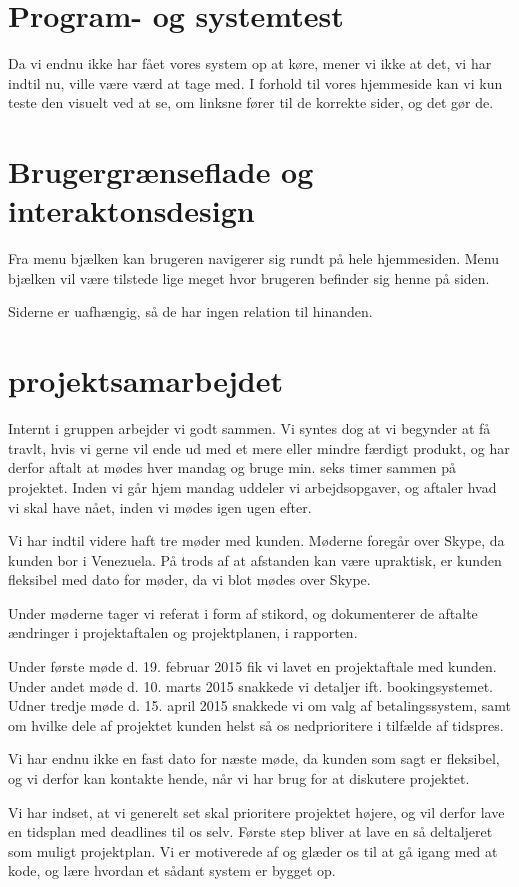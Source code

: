 \documentclass[12pt,a4paper]{article}
\begin{document}
\section{Program- og systemtest}
Da vi endnu ikke har fået vores system op at køre, mener vi ikke at det, vi har indtil nu, ville være værd at tage med. I forhold til vores hjemmeside kan vi kun teste den visuelt ved at se, om linksne fører til de korrekte sider, og det gør de.
\newpage
\section{Brugergrænseflade og interaktonsdesign}
Fra menu bjælken kan brugeren navigerer sig rundt på hele hjemmesiden. Menu bjælken vil være tilstede lige meget hvor brugeren befinder sig henne på siden.

Siderne er uafhængig, så de har ingen relation til hinanden.
\newpage
\section{projektsamarbejdet}
Internt i gruppen arbejder vi godt sammen. Vi syntes dog at vi begynder at få travlt, hvis vi gerne vil ende ud med et mere eller mindre færdigt produkt, og har derfor aftalt at mødes hver mandag og bruge min. seks timer sammen på projektet. Inden vi går hjem mandag uddeler vi arbejdsopgaver, og aftaler hvad vi skal have nået, inden vi mødes igen ugen efter. 

Vi har indtil videre haft tre møder med kunden. Møderne foregår over Skype, da kunden bor i Venezuela. På trods af at afstanden kan være upraktisk, er kunden fleksibel med dato for møder, da vi blot mødes over Skype.

Under møderne tager vi referat i form af stikord, og dokumenterer de aftalte ændringer i projektaftalen og projektplanen, i rapporten. 

Under første møde d. 19. februar 2015 fik vi lavet en projektaftale med kunden.
Under andet møde d. 10. marts 2015 snakkede vi detaljer ift. bookingsystemet.
Udner tredje møde d. 15. april 2015 snakkede vi om valg af betalingssystem, samt om hvilke dele af projektet kunden helst så os nedprioritere i tilfælde af tidspres.

Vi har endnu ikke en fast dato for næste møde, da kunden som sagt er fleksibel, og vi derfor kan kontakte hende, når vi har brug for at diskutere projektet.

Vi har indset, at vi generelt set skal prioritere projektet højere, og vil derfor lave en tidsplan med deadlines til os selv. Første step bliver at lave en så deltaljeret som muligt projektplan.
Vi er motiverede af og glæder os til at gå igang med at kode, og lære hvordan et sådant system er bygget op. 
\newpage
\end{document}
